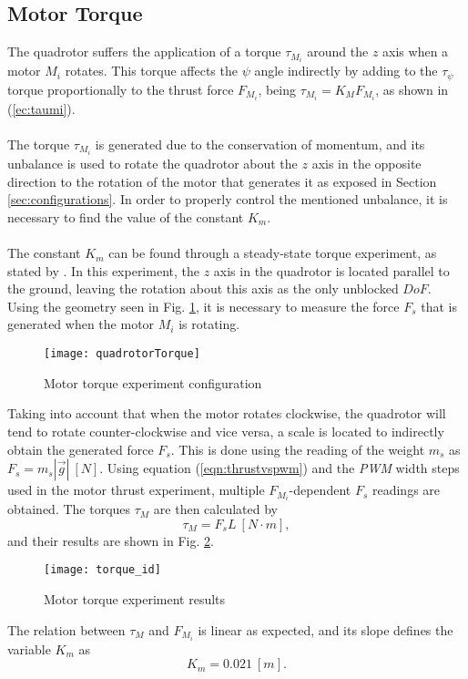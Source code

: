 \subsection{Motor Torque}
The quadrotor suffers the application of a torque $\tau_{M_{i}}$ around the $z$ axis when a motor $M_i$ rotates. This torque affects the $\psi$ angle indirectly by adding to the $\tau_\psi$ torque proportionally to the thrust force $F_{M_i}$, being $\tau_{M_i} = K_{M}F_{M_i}$, as shown in (\ref{ec:taumi}).
\\\\
The torque $\tau_{M_{i}}$ is generated due to the conservation of momentum, and its unbalance is used to rotate the quadrotor about the $z$ axis in the opposite direction to the rotation of the motor that generates it as exposed in Section \ref{sec:configurations}. In order to properly control the mentioned unbalance, it is necessary to find the value of the constant $K_m$.
\\\\
The constant $K_{m}$ can be found through a steady-state torque experiment, as stated by \cite{Oliveira2012}. In this experiment, the $z$ axis in the quadrotor is located parallel to the ground, leaving the rotation about this axis as the only unblocked $DoF$. Using the geometry seen in Fig. \ref{fig:quadrotortorque}, it is necessary to measure the force $F_s$ that is generated when the motor $M_i$ is rotating.
\begin{figure}[H]
	\begin{center}
		\texttt{[image: quadrotorTorque]}    
		\caption{Motor torque experiment configuration} 
		\label{fig:quadrotortorque}
	\end{center}
\end{figure}
Taking into account that when the motor rotates clockwise, the quadrotor will tend to rotate counter-clockwise and vice versa, a scale is located to indirectly obtain the generated force $F_{s}$. This is done using the reading of the weight $m_s$ as $F_{s} = m_{s}|\vec{g}|\ [N]$. Using equation (\ref{eqn:thrustvspwm}) and the \textit{PWM} width steps used in the motor thrust experiment, multiple $F_{M_i}$-dependent $F_s$ readings are obtained. The torques $\tau_M$ are then calculated by
\begin{equation}
\tau_{M} = F_{s}L\ [N\cdot m],
\end{equation}
and their results are shown in Fig. \ref{fig:torque_id}.
\begin{figure}[H]
	\begin{center}
		\texttt{[image: torque\_id]}    
		\caption{Motor torque experiment results} 
		\label{fig:torque_id}
	\end{center}
\end{figure}
The relation between $\tau_M$ and $F_{M_i}$ is linear as expected, and its slope defines the variable $K_m$ as
\begin{equation}
K_{m} = 0.021\ [m].
\end{equation}

